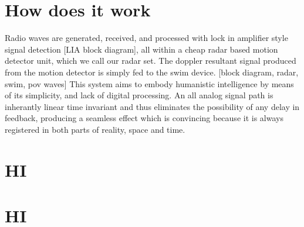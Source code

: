 \documentclass[conference]{IEEEtran}
\begin{document}

\section{How does it work}

Radio waves are generated, received, and processed with lock in amplifier style signal detection [LIA block diagram], all within a cheap radar based motion detector unit, which we call our radar set. 
The doppler resultant signal produced from the motion detector is simply fed to the swim device.  
[block diagram, radar, swim, pov waves]
This system aims to embody humanistic intelligence by means of its simplicity, and lack of digital processing. An all analog signal path is inherantly linear time invariant and thus eliminates the possibility of any delay in feedback, producing a seamless effect which is convincing because it is always registered in both parts of reality, space and time.


\section{HI}


\section{HI}



%
%
\end{document}

